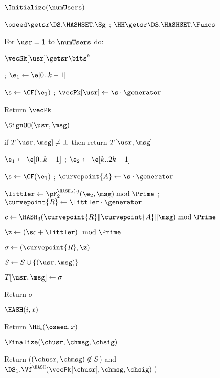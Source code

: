 \begin{figure}
	{
		
		\begin{oracle}{$\Initialize(\numUsers)$}
			\item $\oseed\getsr\DS.\HASHSET.\Sg$ ; 
			$\HH \getsr \DS.\HASHSET.\Funcs$
			\item For $\usr=1$ to $\numUsers$ do:
			\item \quad $\vecSk[\usr] \getsr \bits^k$
			\item \quad {}
			\item \quad \gamechange{$\vecSk[\usr] \gets \e$}
			; $\e_1 \gets \e[0..k-1]$ 
			\item \quad $\s \gets \CF(\e_1)$ ; $\vecPk[\usr] \gets \s\cdot \generator$
			\item Return $\vecPk$
		\end{oracle}
		\ExptSepSpace
		
		\begin{oracle}{$\SignOO(\usr, \msg)$}
			\item if $T[\usr, \msg] \neq \bot$ then return $T[\usr, \msg]$
			\item \gamechange{$\e \gets \vecSk[\usr]$}
			\item $\e_1 \gets \e[0..k-1]$ ; $\e_2 \gets \e[k..2k-1]$ 
			\item $\s \gets \CF(\e_1)$ ; $\curvepoint{A} \gets \s\cdot \generator$
			\item $\littler \gets \pF_2^{\HASH_2(\cdot)}(\e_2,\msg)\bmod \Prime$ 
			; $\curvepoint{R} \gets \littler\cdot \generator$
			\item $c \gets \HASH_3(\curvepoint{R}\|\curvepoint{A}\|\msg) \bmod \Prime$
			\item $\z \gets (\s c + \littler) \mod \Prime$
			\item $\sigma \gets (\curvepoint{R},\z)$
			\item $S \gets S \cup \{(\usr, \msg)\}$
			\item $T[\usr, \msg] \gets \sigma$
			\item Return $\sigma$
		\end{oracle}
		\ExptSepSpace
		
		\begin{oracle}{$\HASH(i,x)$}
			\item Return $\HH_i(\oseed,x)$
		\end{oracle}
		\ExptSepSpace
		
		\begin{oracle}{$\Finalize(\chusr, \chmsg, \chsig)$}
			\item Return ($(\chusr,\chmsg) \not\in S$) and $\DS_1.\Vf^{\HASH}(\vecPk[\chusr], \chmsg, \chsig)\:$) \vspace{2pt}
		\end{oracle}
	}
{
	
}
\end{figure}
